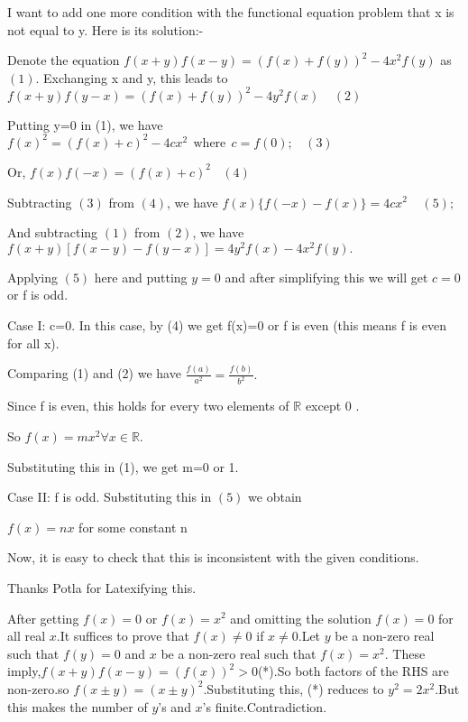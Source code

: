 \begin{solution}
	I want to add one more condition with the functional equation problem that x is not equal to y.
Here is its solution:-

Denote the equation $ f(x+y)f(x-y)=(f(x)+f(y))^2-4x^2f(y) $ as $(1)$.
Exchanging x and y, this leads to
$ f(x+y)f(y-x)=(f(x)+f(y))^2-4y^2f(x) \ \ \ \ \ (2) $

Putting y=0 in (1), we have
$ f(x)^2=(f(x)+c)^2-4cx^2 \ \ \text{where} \ \ c=f(0); \ \ \ \ (3) $

Or,
$ f(x)f(-x)=(f(x)+c)^2 \ \ \ \ (4) $

Subtracting $ (3) $ from $ (4) $, we have
$ f(x)\{f(-x)-f(x)\}=4cx^2 \ \ \ \ \ (5); $

And subtracting $ (1) $ from $ (2) $, we have
$ f(x+y)[f(x-y)-f(y-x)]=4y^2f(x)-4x^2f(y). $

Applying $ (5) $ here and putting $ y=0 $ and after simplifying this we will get $ c=0 $ or f is odd.

Case I: c=0.
In this case, by (4) we get f(x)=0 or f is even (this means f is even for all x).

Comparing (1) and (2) we have $ \frac{f(a)}{a^2}=\frac{f(b)}{b^2}. $

Since f is even, this holds for every two elements of $ \mathbb R $ except $ 0 $ .

So $ f(x)=mx^2 \forall x\in\mathbb R. $

Substituting this in (1), we get m=0 or 1.

Case II: f is odd.
Substituting this in $ (5) $ we obtain

$ f(x)=nx $ for some constant n

Now, it is easy to check that this is inconsistent with the given conditions.


Thanks Potla for Latexifying this.
\end{solution}



\begin{solution}
	After getting $f(x)=0$ or $f(x)=x^2$ and omitting the solution $f(x)=0$ for all real $x$.It suffices to prove that $f(x)\neq 0$ if $x\neq 0$.Let $y$ be a non-zero real such that $f(y)=0$ and $x$ be a non-zero real such that $f(x)=x^2$.
These imply,$f(x+y)f(x-y)=(f(x))^2>0$(*).So both factors of the RHS are non-zero.so $f(x\pm y)=(x\pm y)^2$.Substituting this,
(*) reduces to $y^2=2x^2$.But this makes the number of $y$'s and $x$'s finite.Contradiction.
\end{solution}



